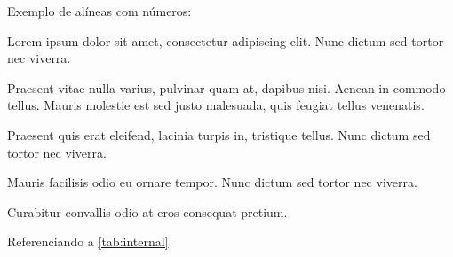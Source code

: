 
Exemplo de alíneas com números:

	\begin{alineascomnumero}
		\item Lorem ipsum dolor sit amet, consectetur adipiscing elit. Nunc dictum sed tortor nec viverra.
		\item Praesent vitae nulla varius, pulvinar quam at, dapibus nisi. Aenean in commodo tellus. Mauris molestie est sed justo malesuada, quis feugiat tellus venenatis.
		\item Praesent quis erat eleifend, lacinia turpis in, tristique tellus. Nunc dictum sed tortor nec viverra.
		\item Mauris facilisis odio eu ornare tempor. Nunc dictum sed tortor nec viverra.
		\item Curabitur convallis odio at eros consequat pretium.
	\end{alineascomnumero}

\lipsum[12]

\begin{table}[h!]	
	\centering
\end{table}

\lipsum[2] Referenciando a \autoref{tab:internal} \lipsum[2]


